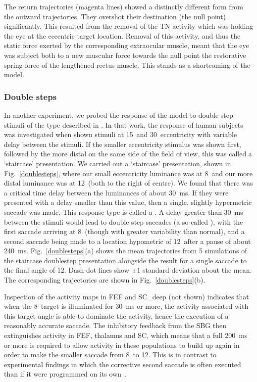 \documentclass{frontiersSCNS}
\begin{document}
The return trajectories (magenta lines) showed a distinctly different
form from the outward trajectories. They overshot their destination
(the null point) significantly. This resulted from the removal of the
TN activity which was holding the eye at the eccentric target
location. Removal of this activity, and thus the static force exerted
by the corresponding extraocular muscle, meant that the eye was
subject both to a new muscular force towards the null point
 the restorative spring force of the lengthened rectus
muscle. This stands as a shortcoming of the model.

\subsubsection{Double steps}

In another experiment, we probed the response of the model to double
step stimuli of the type described in \cite{becker_analysis_1979}. In
that work, the response of human subjects was investigated when shown
stimuli at 15\dg~and 30\dg~eccentricity with variable delay between
the stimuli. If the smaller eccentricity stimulus was shown first,
followed by the more distal on the same side of the field of view,
this was called a `staircase' presentation.
We carried out a `staircase' presentation, shown in
Fig.~\ref{doublesteps}, where our small eccentricity luminance was at
8\dg~and our more distal luminance was at 12\dg~(both to the right of
centre). We found that there was a critical time delay between the
luminances of about 30~ms. If they were presented with a delay smaller
than this value, then a single, slightly hypermetric saccade was
made. This response type is called a . A delay
greater than 30~ms between the stimuli would lead to double step
saccades (a so-called ), with the first
saccade arriving at 8\dg~(though with greater variability than
normal), and a second saccade being made to a location hypometric of
12\dg~after a pause of about 240~ms.  Fig.~\ref{doublesteps}(a) shows
the mean trajectories from 5 simulations of the staircase doublestep
presentation alongside the result for a single saccade to the final
angle of 12\dg. Dash-dot lines show $\pm$1 standard deviation about
the mean. The corresponding trajectories are shown in
Fig.~\ref{doublesteps}(b).

Inspection of the activity maps in FEF and SC\_deep (not shown)
indicates that when the 8\dg~target is illuminated for 30~ms or more,
the activity associated with this target angle is able to dominate the
activity, hence the execution of a reasonably accurate saccade. The
inhibitory feedback from the SBG then extinguishes activity in FEF,
thalamus and SC, which means that a full 200~ms or more is required to
allow activity in these populations to build up again in order to make
the smaller saccade from 8\dg~to 12\dg. This is in contrast to
experimental findings in which the corrective second saccade is often
executed  than if it were programmed on its
own~\citep{becker_analysis_1979}.
\end{document}
